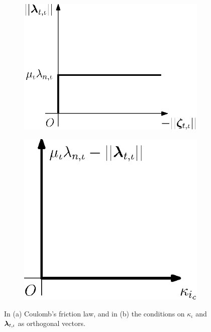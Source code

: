 \documentclass[../DC2017114Bouma.tex]{subfiles}
\begin{document}
\begin{figure}[h]
\centering
\begin{subfigure}{0.38\textwidth}
\centering
\includegraphics[width=\linewidth]{coulombfriction.eps}\caption{}\vspace{1.25cm}\label{fig:coulombfriction}
\end{subfigure}
\qquad
\begin{subfigure}{0.3\textwidth}
\centering
\includegraphics[width=\linewidth]{coulombort.eps}\caption{}\label{fig:coulombort}
\end{subfigure}
\caption{In \textnormal{(a)} Coulomb's friction law, and in \textnormal{(b)} the conditions on $\kappa_{\iota}$ and $\boldsymbol{\lambda}_{t,\iota}$ as orthogonal vectors.}
\end{figure}
\end{document}
